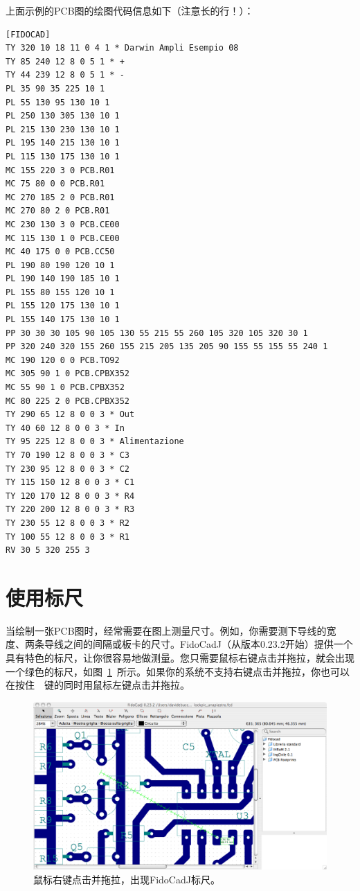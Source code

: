 \documentclass[10pt,a4paper,twoside]{scrreprt}
\newcommand{\keyevidence}[1]{\fbox{#1}}
\begin{document}
上面示例的PCB图的绘图代码信息如下（注意长的行！）：

\begin{lstlisting}
[FIDOCAD]
TY 320 10 18 11 0 4 1 * Darwin Ampli Esempio 08 
TY 85 240 12 8 0 5 1 * + 
TY 44 239 12 8 0 5 1 * - 
PL 35 90 35 225 10 1
PL 55 130 95 130 10 1
PL 250 130 305 130 10 1
PL 215 130 230 130 10 1
PL 195 140 215 130 10 1
PL 115 130 175 130 10 1
MC 155 220 3 0 PCB.R01
MC 75 80 0 0 PCB.R01
MC 270 185 2 0 PCB.R01
MC 270 80 2 0 PCB.R01
MC 230 130 3 0 PCB.CE00
MC 115 130 1 0 PCB.CE00
MC 40 175 0 0 PCB.CC50
PL 190 80 190 120 10 1
PL 190 140 190 185 10 1
PL 155 80 155 120 10 1
PL 155 120 175 130 10 1
PL 155 140 175 130 10 1
PP 30 30 30 105 90 105 130 55 215 55 260 105 320 105 320 30 1
PP 320 240 320 155 260 155 215 205 135 205 90 155 55 155 55 240 1
MC 190 120 0 0 PCB.TO92
MC 305 90 1 0 PCB.CPBX352
MC 55 90 1 0 PCB.CPBX352
MC 80 225 2 0 PCB.CPBX352
TY 290 65 12 8 0 0 3 * Out 
TY 40 60 12 8 0 0 3 * In 
TY 95 225 12 8 0 0 3 * Alimentazione 
TY 70 190 12 8 0 0 3 * C3 
TY 230 95 12 8 0 0 3 * C2 
TY 115 150 12 8 0 0 3 * C1 
TY 120 170 12 8 0 0 3 * R4 
TY 220 200 12 8 0 0 3 * R3 
TY 230 55 12 8 0 0 3 * R2 
TY 100 55 12 8 0 0 3 * R1 
RV 30 5 320 255 3
\end{lstlisting} 

\section{使用标尺}

当绘制一张PCB图时，经常需要在图上测量尺寸。例如，你需要测下导线的宽度、两条导线之间的间隔或板卡的尺寸。FidoCadJ（从版本0.23.2开始）提供一个具有特色的标尺，让你很容易地做测量。您只需要鼠标右键点击并拖拉，就会出现一个绿色的标尺，如图~\ref{fig_fidocadj_righello}~所示。如果你的系统不支持右键点击并拖拉，你也可以在按住~\keyevidence{Shift}~键的同时用鼠标左键点击并拖拉。

\begin{figure}
\includegraphics[width=\textwidth]{fidocadj_righello}
\caption{鼠标右键点击并拖拉，出现FidoCadJ标尺。}
\label{fig_fidocadj_righello}
\end{figure}
\end{document}
